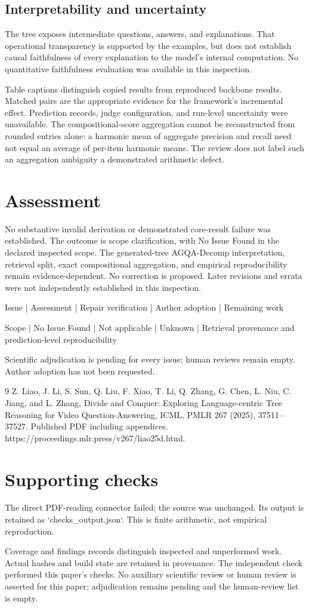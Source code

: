 \documentclass[10pt]{article}
\begin{document}
\subsection*{Interpretability and uncertainty}
The tree exposes intermediate questions, answers, and explanations. That operational transparency is supported by the examples, but does not establish causal faithfulness of every explanation to the model’s internal computation. No quantitative faithfulness evaluation was available in this inspection.\par
Table captions distinguish copied results from reproduced backbone results. Matched pairs are the appropriate evidence for the framework’s incremental effect. Prediction records, judge configuration, and run-level uncertainty were unavailable. The compositional-score aggregation cannot be reconstructed from rounded entries alone: a harmonic mean of aggregate precision and recall need not equal an average of per-item harmonic means. The review does not label such an aggregation ambiguity a demonstrated arithmetic defect.\par
\section*{Assessment}
No substantive invalid derivation or demonstrated core-result failure was established. The outcome is scope clarification, with No Issue Found in the declared inspected scope. The generated-tree AGQA-Decomp interpretation, retrieval split, exact compositional aggregation, and empirical reproducibility remain evidence-dependent. No correction is proposed. Later revisions and errata were not independently established in this inspection.\par
Issue | Assessment | Repair verification | Author adoption | Remaining work\par
Scope | No Issue Found | Not applicable | Unknown | Retrieval provenance and prediction-level reproducibility\par
Scientific adjudication is pending for every issue; human reviews remain empty. Author adoption has not been requested.\par
9 Z. Liao, J. Li, S. Sun, Q. Liu, F. Xiao, T. Li, Q. Zhang, G. Chen, L. Niu, C. Jiang, and L. Zhang, Divide and Conquer: Exploring Language-centric Tree Reasoning for Video Question-Answering, ICML, PMLR 267 (2025), 37511–37527. Published PDF including appendices. https://proceedings.mlr.press/v267/liao25d.html.\par
\section*{Supporting checks}
The direct PDF-reading connector failed; the source was unchanged. Its output is retained as `checks\_output.json`. This is finite arithmetic, not empirical reproduction.\par
Coverage and findings records distinguish inspected and unperformed work. Actual hashes and build state are retained in provenance. The independent check performed this paper’s checks. No auxiliary scientific review or human review is asserted for this paper; adjudication remains pending and the human-review list is empty.\par
\end{document}
